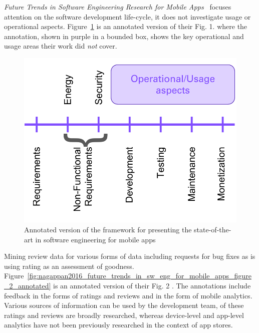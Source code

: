 \emph{Future Trends in Software Engineering Research for Mobile Apps}~ focuses attention on the software development life-cycle, it does not investigate usage or operational aspects. Figure~\ref{fig:nagappan2016_future_trends_in_sw_eng_for_mobile_apps_figure_1_annotated} is an annotated version of their Fig. 1.  where the annotation, shown in purple in a bounded box, shows the key operational and usage areas their work did \emph{not} cover. 


\begin{figure}
    \centering
    \includegraphics[width=\linewidth]{images/my/framework-for-presenting-the-state-of-the-art-in-sw-end-for-mobile-apps.pdf}
    \caption[Framework for presenting the state-of-the-art in software engineering for mobile apps, adapted from~\cite{nagappan2016_future_trends_in_sw_eng_for_mobile_apps}]{Annotated version of the framework for presenting the state-of-the-art in software engineering for mobile apps~\cite{nagappan2016_future_trends_in_sw_eng_for_mobile_apps}}
    \label{fig:nagappan2016_future_trends_in_sw_eng_for_mobile_apps_figure_1_annotated}
\end{figure}


Mining review data for various forms of data including requests for bug fixes as is using rating as an assessment of goodness. 
Figure~\ref{fig:nagappan2016_future_trends_in_sw_eng_for_mobile_apps_figure_2_annotated} is an annotated version of their Fig. 2 . The annotations include feedback in the forms of ratings and reviews and in the form of mobile analytics. Various sources of information can be used by the development team, of these ratings and reviews are broadly researched, whereas device-level and app-level analytics have not been previously researched in the context of app stores.


